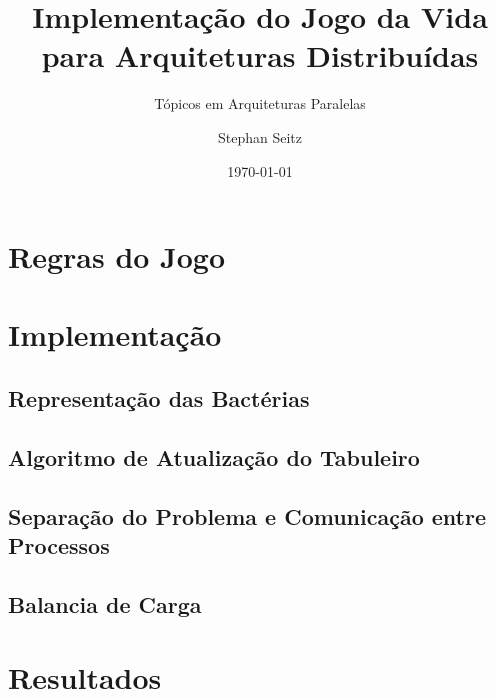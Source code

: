 \documentclass[
  oneside,
  11pt, a4paper,
  footinclude=true,
  headinclude=true,
  cleardoublepage=empty
]{scrartcl}
\title{Implementação do Jogo da Vida para Arquiteturas Distribuídas}
\subtitle{T\'opicos em Arquiteturas Paralelas}
\author{Stephan Seitz}
\date{\today}
\begin{document}
\maketitle
\tableofcontents
\newpage

\section{Regras do Jogo}


\section{Implementação}

\subsection{Representação das Bactérias}


\subsection{Algoritmo de Atualização do Tabuleiro}

\subsection{Separação do Problema e Comunicação entre Processos}

\subsection{Balancia de Carga}

\section{Resultados}

\newpage
\printbibliography
\end{document}
